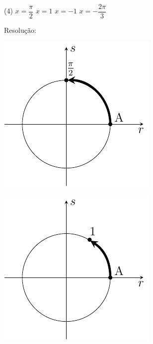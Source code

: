 \begin{tasks}(4)
    \task $x=\dfrac{\pi}{2}$
    \task $x=1$
    \task $x=-1$
    \task $x=-\dfrac{2 \pi}{3}$
\end{tasks}
\noindent
Resolução:\\
\begin{minipage}{\textwidth}
     \centering
\begin{minipage}{0.24\textwidth}
     \centering
            \includegraphics[width=\textwidth]{Imagens/fig09.pdf}
\end{minipage}
\begin{minipage}{0.24\textwidth}
        \centering
            \includegraphics[width=\textwidth]{Imagens/fig10.pdf}

\end{minipage}
\end{minipage}
